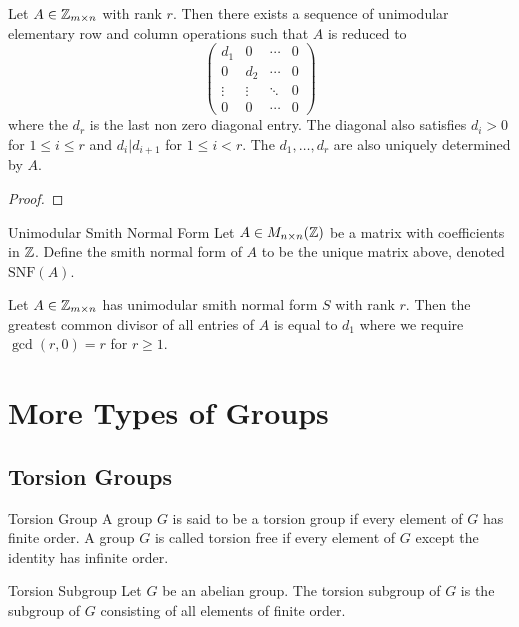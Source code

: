 \documentclass[a4paper]{article}
\begin{document}
\begin{thm}{}{} Let $A\in\mathbb{Z}_{m\times n}$ with rank $r$. Then there exists a sequence of unimodular elementary row and column operations such that $A$ is reduced to $$\begin{pmatrix}
d_1 & 0 & \cdots & 0\\
0 & d_2 & \cdots & 0\\
\vdots & \vdots & \ddots & 0\\
0 & 0 & \cdots & 0
\end{pmatrix}$$ where the $d_r$ is the last non zero diagonal entry. The diagonal also satisfies $d_i>0$ for $1\leq i\leq r$ and $d_i|d_{i+1}$ for $1\leq i<r$. The $d_1,\dots,d_r$ are also uniquely determined by $A$. \tcbline
\begin{proof}
\end{proof}
\end{thm}

\begin{defn}{Unimodular Smith Normal Form}{} Let $A\in M_{n\times n}(\mathbb{Z})$ be a matrix with coefficients in $\mathbb{Z}$. Define the smith normal form of $A$ to be the unique matrix above, denoted $\text{SNF}(A)$. 
\end{defn}

\begin{lmm}{}{} Let $A\in\mathbb{Z}_{m\times n}$ has unimodular smith normal form $S$ with rank $r$. Then the greatest common divisor of all entries of $A$ is equal to $d_1$ where we require $\gcd(r,0)=r$ for $r\geq 1$. 
\end{lmm}

\pagebreak
\section{More Types of Groups}
\subsection{Torsion Groups}
\begin{defn}{Torsion Group}{} A group $G$ is said to be a torsion group if every element of $G$ has finite order. A group $G$ is called torsion free if every element of $G$ except the identity has infinite order. 
\end{defn}

\begin{defn}{Torsion Subgroup}{} Let $G$ be an abelian group. The torsion subgroup of $G$ is the subgroup of $G$ consisting of all elements of finite order. 
\end{defn}
\end{document}
